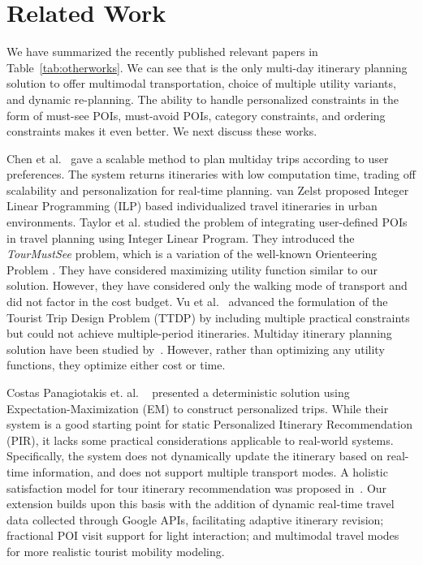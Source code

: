 \section{Related Work}
\label{Rel_Work}

We have summarized the recently published relevant papers in Table~\ref{tab:otherworks}. We can see that \trip is the only multi-day itinerary planning solution to offer multimodal transportation, choice of multiple utility variants, and dynamic re-planning. The ability to handle personalized constraints in the form of must-see POIs, must-avoid POIs, category constraints, and ordering constraints makes it even better. We next discuss these works.
 
Chen et al.~\citep{chen2014automatic} gave a scalable method to plan multiday trips according to user preferences. The system returns itineraries with low computation time, trading off scalability and personalization for real-time planning. van Zelst \citep{vanzelst2016itinerary} proposed Integer Linear Programming (ILP) based individualized travel itineraries in urban environments. Taylor et al. \citep{taylor2018tour} studied the problem of integrating user-defined POIs in travel planning using Integer Linear Program. They introduced the \emph{TourMustSee} problem, which is a variation of the well-known Orienteering Problem \citep{golden1987orienteering}. They have considered maximizing utility function similar to our \emph{\trip} solution. However, they have considered only the walking mode of transport and did not factor in the cost budget. Vu et al.~\citep{vu2022branch} advanced the formulation of the Tourist Trip Design Problem (TTDP) by including multiple practical constraints but could not achieve multiple-period itineraries. Multiday itinerary planning solution have been studied by~\citep{chen2014automatic,vanzelst2016itinerary,liu2024personalized,rambha2024optimized}. However, rather than optimizing any utility functions, they optimize either cost or time.  

Costas Panagiotakis et. al. ~\citep{panagiotakis2024expectation} presented a deterministic solution using Expectation-Maximization (EM) to construct personalized trips. While their system is a good starting point for static Personalized Itinerary Recommendation (PIR), it lacks some practical considerations applicable to real-world systems. Specifically, the system does not dynamically update the itinerary based on real-time information, and does not support multiple transport modes. A holistic satisfaction model for tour itinerary recommendation was proposed in~\citep{liu2024personalized}. Our extension builds upon this basis with the addition of dynamic real-time travel data collected through Google APIs, facilitating adaptive itinerary revision; fractional POI visit support for light interaction; and multimodal travel modes for more realistic tourist mobility modeling. 


